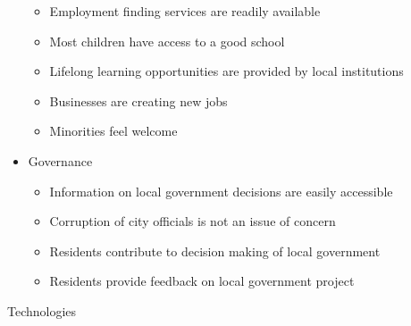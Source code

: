 \documentclass[
  english,
  12pt,
  a4paper,
]{scrartcl}
\providecommand{\tightlist}{%
  \setlength{\itemsep}{0pt}\setlength{\parskip}{0pt}}
\begin{document}
\begin{itemize}
  \begin{itemize}
  \tightlist
  \item
    Employment finding services are readily available
  \item
    Most children have access to a good school
  \item
    Lifelong learning opportunities are provided by local institutions
  \item
    Businesses are creating new jobs
  \item
    Minorities feel welcome
  \end{itemize}
\item
  Governance

  \begin{itemize}
  \tightlist
  \item
    Information on local government decisions are easily accessible
  \item
    Corruption of city officials is not an issue of concern
  \item
    Residents contribute to decision making of local government
  \item
    Residents provide feedback on local government project
  \end{itemize}
\end{itemize}

Technologies
\end{document}
